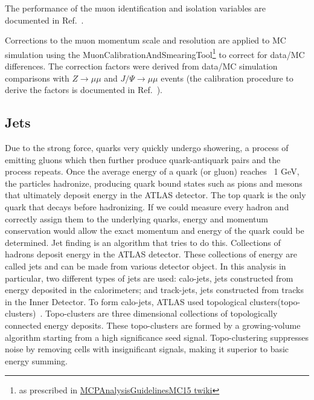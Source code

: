 The performance of the muon identification and isolation variables are documented in Ref.~\cite{Aad:2016jkr}.

Corrections to the muon momentum scale and resolution are applied to MC simulation using the MuonCalibrationAndSmearingTool\footnote{as prescribed 
in \href{https://twiki.cern.ch/twiki/bin/view/AtlasProtected/MCPAnalysisGuidelinesMC15\#Muon_momentum_scale_and_resoluti} {MCPAnalysisGuidelinesMC15 twiki}} 
to correct for  data/MC differences. The correction factors were derived from data/MC 
simulation comparisons with $Z\to \mu \mu$ and $J/\Psi \to \mu \mu$ events (the calibration procedure to derive the factors 
is documented in Ref.~\cite{Aad:2016jkr}).
\subsection{Jets}
Due to the strong force, quarks very quickly undergo showering, a process of emitting gluons which then further produce quark-antiquark pairs and the process repeats. Once the average energy of a quark (or gluon) reaches ~1 GeV, the particles hadronize, producing quark bound states such as pions and mesons that ultimately deposit energy in the ATLAS detector. The top quark is the only quark that decays before hadronizing. If we could measure every hadron and correctly assign them to the underlying quarks, energy and momentum conservation would allow the exact momentum and energy of the quark could be determined. Jet finding is an algorithm that tries to do this. Collections of hadrons deposit energy in the ATLAS detector. These collections of energy are called jets and can be made from various detector object. In this analysis in particular, two different types of jets are used: calo-jets, jets constructed from energy deposited in the calorimeters; and track-jets, jets constructed from tracks in the Inner Detector. To form calo-jets, ATLAS used topological clusters(topo-clusters)~\cite{Aad:2016upy}. Topo-clusters are three dimensional collections of topologically connected energy deposits. These topo-clusters are formed by a growing-volume algorithm starting from a high significance seed signal. Topo-clustering suppresses noise by removing cells with insignificant signals, making it superior to basic energy summing. \newline


